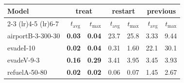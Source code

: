\begin{tabular}{lrrrrrr}
\toprule
\multirow{2}{*}{Model} & \multicolumn{2}{c}{treat} & \multicolumn{2}{c}{restart} & \multicolumn{2}{c}{previous} \\
    \cmidrule(lr){2-3} \cmidrule(lr){4-5} \cmidrule(lr){6-7}
 & $t_\text{avg}$ & $t_\text{max}$ & $t_\text{avg}$ & $t_\text{max}$ & $t_\text{avg}$ & $t_\text{max}$ \\
\midrule
airportB-3-300-30 & \textbf{0.03} & \textbf{0.04} & 23.7 & 25.8 & 3.33 & 9.44 \\
evadeI-10 & \textbf{0.02} & \textbf{0.04} & 0.31 & 1.60 & 22.1 & 30.1 \\
evadeV-9-3 & \textbf{0.16} & \textbf{0.29} & 3.41 & 3.95 & 3.45 & 3.93 \\
refuelA-50-80 & \textbf{0.02} & \textbf{0.02} & 0.06 & 0.07 & 1.45 & 2.67 \\
\bottomrule
\end{tabular}
